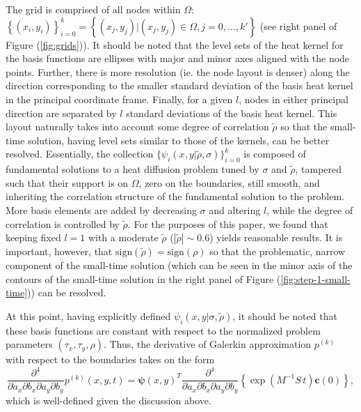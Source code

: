 The grid is comprised of all nodes within $\Omega$:
$\left\{(x_i, y_i)\right\}_{i=0}^k = \left\{ (x_j, y_j) | (x_j, y_j)
  \in \Omega, j = 0, \ldots, k' \right\}$ (see right panel of Figure
(\ref{fig:grids})). It should be noted that the level sets of the heat
kernel for the basis functions are ellipses with major and minor axes
aligned with the node points. Further, there is more resolution
(ie. the node layout is denser) along the direction corresponding to
the smaller standard deviation of the basis heat kernel in the
principal coordinate frame. Finally, for a given $l$, nodes in either
principal direction are separated by $l$ standard deviations of the
basis heat kernel. This layout naturally takes into account some
degree of correlation $\tilde{\rho}$ so that the small-time solution,
having level sets similar to those of the kernels, can be better
resolved. Essentially, the collection
$\{ \psi_i(x,y| \tilde{\rho}, \sigma) \}_{i=0}^k$ is composed of
fundamental solutions to a heat diffusion problem tuned by $\sigma$
and $\tilde{\rho}$, tampered such that their support is on $\Omega$,
zero on the boundaries, still smooth, and inheriting the correlation
structure of the fundamental solution to the problem. More basis
elements are added by decreasing $\sigma$ and altering $l$, while the
degree of correlation is controlled by $\tilde{\rho}$. For
the purposes of this paper, we found that keeping fixed $l=1$ with a
moderate $\tilde{\rho}$ ($|\tilde{\rho}| \sim 0.6$) yields reasonable
results. It is important, however, that
$\mbox{sign}(\tilde{\rho}) = \mbox{sign}(\rho)$ so that the
problematic, narrow component of the small-time solution (which can be
seen in the minor axis of the contours of the small-time solution in
the right panel of Figure (\ref{fig:step-1-small-time})) can be
resolved.

%

At this point, having explicitly defined
$\psi_i(x,y|\sigma,\tilde{\rho})$, it should be noted that these basis
functions are constant with respect to the normalized problem
parameters $(\tau_x, \tau_y, \rho)$. Thus, the derivative of Galerkin
approximation $p^{(k)}$ with respect to the boundaries takes on the
form
\[
  \frac{\partial^4}{\partial a_x \partial b_x \partial a_y \partial
    b_y} p^{(k)}(x,y,t) = \boldsymbol{\psi}(x,y)^T
  \frac{\partial^4}{\partial a_x \partial b_x \partial a_y \partial
    b_y} \left\{ \exp\left( M^{-1}S\, t \right) \mathbf{c}(0) \right\},
\]
which is well-defined given the discussion above.

